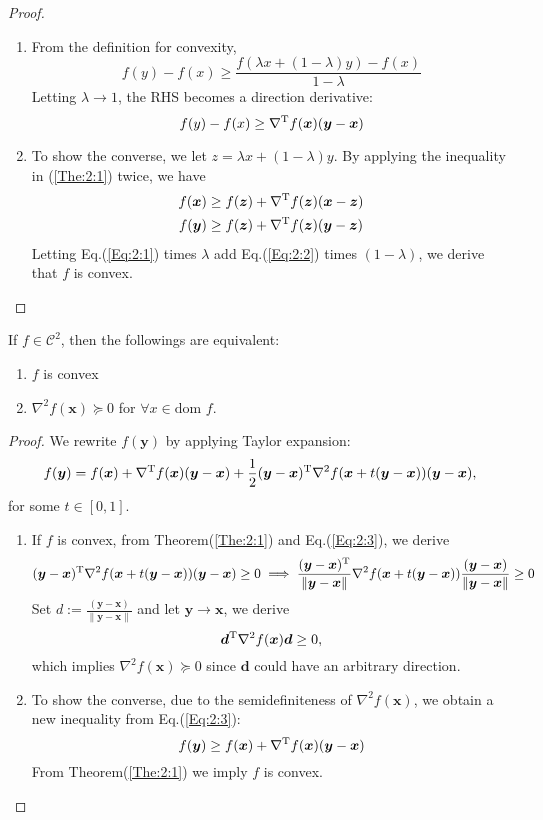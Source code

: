 \begin{proof}
\begin{enumerate}
\item
From the definition for convexity,
\[
f(y) - f(x)\ge\frac{f(\lambda x + (1-\lambda) y) - f(x)}{1 - \lambda}
\]
Letting $\lambda\to1$, the RHS becomes a direction derivative:
\[
f(y) - f(x)\ge\nabla^{\mathrm T} f(\bm x)(\bm y-\bm x)
\]
\item
To show the converse, we let $z = \lambda x+ (1-\lambda)y$. By applying the inequality in (\ref{The:2:1}) twice, we have
\begin{align}
f(\bm x)&\ge f(\bm z)+\nabla\trans f(\bm z)(\bm x-\bm z)\label{Eq:2:1}\\
f(\bm y)&\ge f(\bm z)+\nabla\trans f(\bm z)(\bm y-\bm z)\label{Eq:2:2}
\end{align}
Letting Eq.(\ref{Eq:2:1}) times $\lambda$ add Eq.(\ref{Eq:2:2}) times $(1-\lambda)$, we derive that $f$ is convex.
\end{enumerate}
\end{proof}
\begin{theorem}
If $f\in\mathcal{C}^2$, then the followings are equivalent:
\begin{enumerate}
\item
$f$ is convex
\item
$\nabla^2f(\bm x)\succeq0$ for $\forall x\in\mbox{dom }f$.
\end{enumerate}
\end{theorem}
\begin{proof}
We rewrite $f(\bm y)$ by applying Taylor expansion:
\begin{equation}
f(\bm y) = f(\bm x)+\nabla\trans f(\bm x)(\bm y-\bm x)+\frac{1}{2}(\bm y-\bm x)\trans\nabla^2 f(\bm x+t(\bm y-\bm x))(\bm y-\bm x),\label{Eq:2:3}
\end{equation}
for some $t\in[0,1]$.
\begin{enumerate}
\item
If $f$ is convex, from Theorem(\ref{The:2:1}) and Eq.(\ref{Eq:2:3}), we derive
\[
(\bm y-\bm x)^{\mathrm T}\nabla^2 f(\bm x+t(\bm y-\bm x))(\bm y-\bm x)\ge0\implies \frac{(\bm y-\bm x)^{\mathrm T}}{\|\bm y-\bm x\|}\nabla^2 f(\bm x+t(\bm y-\bm x))\frac{(\bm y-\bm x)}{\|\bm y-\bm x\|}\ge0
\]
Set $d:=\frac{(\bm y-\bm x)}{\|\bm y-\bm x\|}$ and let $\bm y\to\bm x$, we derive
\[
\bm d^{\mathrm T}\nabla^2 f(\bm x)\bm d\ge0,
\]
which implies $\nabla^2 f(\bm x)\succeq0$ since $\bm d$ could have an arbitrary direction.
\item
To show the converse, due to the semidefiniteness of $\nabla^2 f(\bm x)$, we obtain a new inequality from Eq.(\ref{Eq:2:3}):
\[
f(\bm y) \ge f(\bm x)+\nabla^{\mathrm T} f(\bm x)(\bm y-\bm x)
\]
From Theorem(\ref{The:2:1}) we imply $f$ is convex.
\end{enumerate}
\end{proof}
